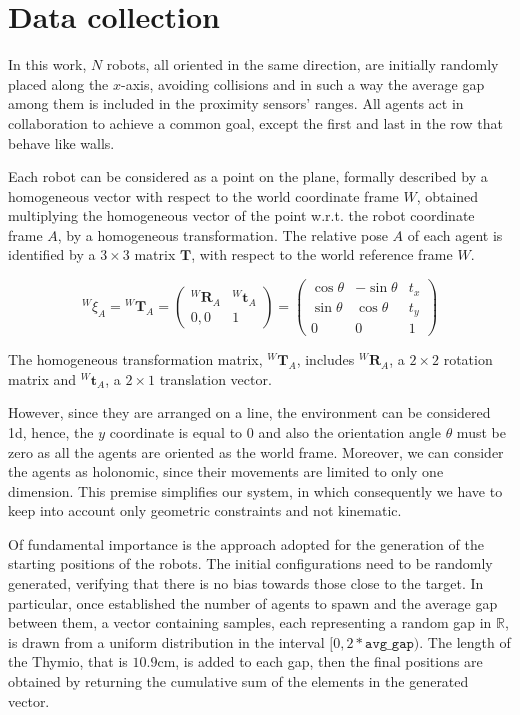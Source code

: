 \section{Data collection}
\label{sec:dataset}

In this work, $N$ robots, all oriented in the same direction, are initially 
randomly placed along the $x$-axis, avoiding collisions and in such a way the 
average gap among them is included in the proximity sensors' ranges. 
All agents act in collaboration to achieve a common goal, except the first and last 
in the row that behave like walls.

Each robot can be considered as a point on the plane, formally described by a 
homogeneous vector with respect to the world coordinate frame $W$, obtained 
multiplying the homogeneous vector of the point w.r.t. the robot coordinate 
frame $A$, by a homogeneous transformation. The relative pose $A$ of each 
agent is identified by a $3 \times 3$ matrix $\mathbf{T}$, with respect to the 
world reference frame $W$. 
\begin{Equation}[!htb]
	\centering
	\begin{equation}
	{^W\!\xi_A} = {^W\!\mathbf{T}_A} 
	=
	\begin{pmatrix}
	^W\!\mathbf{R}_A & ^W\!\mathbf{t}_A\\
	0, 0 & 1
	\end{pmatrix}
	=
	\begin{pmatrix}
	\cos \theta & - \sin \theta & t_x\\
	\sin \theta & \cos \theta & t_y\\
	0 & 0 & 1
	\end{pmatrix}
	\end{equation}
	\caption[Homogeneous transformation matrix.]{The homogeneous 
		transformation matrix, 	$^W\!\mathbf{T}_A$, includes $^W\!\mathbf{R}_A$, 
		a 
		$2 \times 2$ rotation matrix and $^W\!\mathbf{t}_A$, a $2 \times 1$ 
		translation vector.}
	\label{eq:hommatrix}
\end{Equation}
However, since they are arranged on a line, the environment can be considered 
\gls{1d}, hence, the $y$ coordinate is equal to $0$ and also the orientation angle 
$\theta$ must be zero as all the agents are oriented as the world frame. 
Moreover, we can consider the agents as holonomic, since their movements are 
limited to only one dimension. This premise simplifies our system, in which 
consequently we have to keep into account only geometric constraints and not
kinematic.

Of fundamental importance is the approach adopted for the generation of the 
starting positions of the robots.
The initial configurations need to be randomly generated, verifying that there is 
no bias towards those close to the target.
In particular, once established the number of agents to spawn and the average 
gap between them, a vector containing samples, each representing a random 
gap in $\mathbb{R}$, is drawn from a uniform distribution in the interval $[0, 
2*\mathtt{avg\_gap})$. 
The length of the Thymio, that is $10.9$cm, is added to each gap, then the 
final positions are obtained by returning the cumulative sum of the elements in 
the generated vector. 

